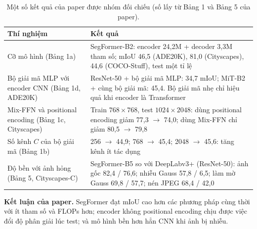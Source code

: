 \begin{table}[H]
\centering
\caption{Một số kết quả của paper được nhóm đối chiếu (số lấy từ Bảng 1 và Bảng 5 của paper).}\label{tab:paper-numbers}
\begin{tabularx}{\linewidth}{@{}P{4.6cm}L@{}}
\toprule
Thí nghiệm & Kết quả \\\midrule
Cỡ mô hình (Bảng 1a) & SegFormer-B2: encoder 24,2M + decoder 3,3M tham số; mIoU 46,5 (ADE20K), 81,0 (Cityscapes), 44,6 (COCO-Stuff), test một tỉ lệ \\
Bộ giải mã MLP với encoder CNN (Bảng 1d, ADE20K) & ResNet-50 + bộ giải mã MLP: 34,7 mIoU; MiT-B2 + cùng bộ giải mã: 45,4. Bộ giải mã nhẹ chỉ hiệu quả khi encoder là Transformer \\
Mix-FFN và positional encoding (Bảng 1c, Cityscapes) & Train $768\times768$, test $1024\times2048$: dùng positional encoding giảm 77,3 $\rightarrow$ 74,0; dùng Mix-FFN chỉ giảm 80,5 $\rightarrow$ 79,8 \\
Số kênh $C$ của bộ giải mã (Bảng 1b) & 256 $\rightarrow$ 44,9; 768 $\rightarrow$ 45,4; 2048 $\rightarrow$ 45,6: tăng kênh ít tác dụng \\
Độ bền với ảnh hỏng (Bảng 5, Cityscapes-C) & SegFormer-B5 so với DeepLabv3+ (ResNet-50): ảnh gốc 82,4 / 76,6; nhiễu Gauss 57,8 / 6,5; làm mờ Gauss 69,8 / 57,7; nén JPEG 68,4 / 42,0 \\
\bottomrule
\end{tabularx}
\end{table}

\textbf{Kết luận của paper.} SegFormer đạt mIoU cao hơn các phương pháp cùng thời với ít tham số và FLOPs hơn; encoder không
positional encoding chịu được việc đổi độ phân giải lúc test; và mô hình bền hơn hẳn CNN khi ảnh bị nhiễu.


